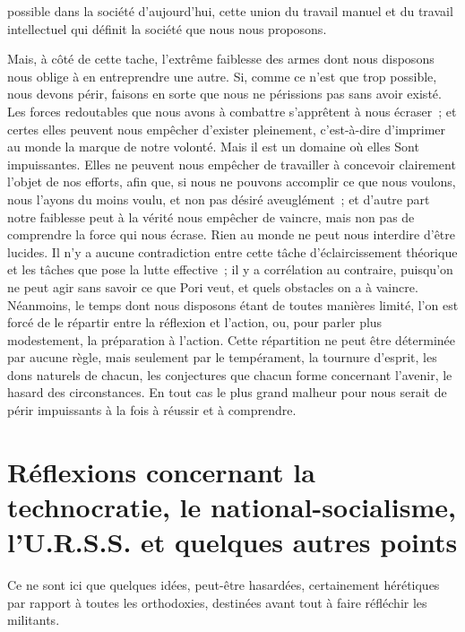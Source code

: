 \documentclass[french,twoside]{book} %
\newcommand{\signed}[1]{\bigbreak\filbreak{\raggedleft #1\par}\medskip}
\begin{document}
possible dans la société d'aujourd'hui, cette union du travail manuel et du travail intellectuel qui définit la société que nous nous proposons.\par
Mais, à côté de cette tache, l'extrême faiblesse des armes dont nous disposons nous oblige à en entreprendre une autre. Si, comme ce n'est que trop possible, nous devons périr, faisons en sorte que nous ne périssions pas sans avoir existé. Les forces redoutables que nous avons à combattre s'apprêtent à nous écraser ; et certes elles peuvent nous empêcher d'exister pleinement, c'est-à-dire d'imprimer au monde la marque de notre volonté. Mais il est un domaine où elles Sont impuissantes. Elles ne peuvent nous empêcher de travailler à concevoir clairement l'objet de nos efforts, afin que, si nous ne pouvons accomplir ce que nous voulons, nous l'ayons du moins voulu, et non pas désiré aveuglément ; et d'autre part notre faiblesse peut à la vérité nous empêcher de vaincre, mais non pas de comprendre la force qui nous écrase. Rien au monde ne peut nous interdire d'être lucides. Il n'y a aucune contradiction entre cette tâche d'éclaircissement théorique et les tâches que pose la lutte effective ; il y a corrélation au contraire, puisqu'on ne peut agir sans savoir ce que Pori veut, et quels obstacles on a à vaincre. Néanmoins, le temps dont nous disposons étant de toutes manières limité, l'on est forcé de le répartir entre la réflexion et l'action, ou, pour parler plus modestement, la préparation à l'action. Cette répartition ne peut être déterminée par aucune règle, mais seulement par le tempérament, la tournure d'esprit, les dons naturels de chacun, les conjectures que chacun forme concernant l'avenir, le hasard des circonstances. En tout cas le plus grand malheur pour nous serait de périr impuissants à la fois à réussir et à comprendre.\par


\signed{{\itshape (Révolution Prolétarienne}, no 158, 25 août 1933.)}
\section[{Réflexions concernant la technocratie, le national-socialisme, l’U.R.S.S. et quelques autres points}]{Réflexions concernant la technocratie, le national-socialisme, l’U.R.S.S. et quelques autres points}\renewcommand{\leftmark}{Réflexions concernant la technocratie, le national-socialisme, l’U.R.S.S. et quelques autres points}

\noindent \par
Ce ne sont ici que quelques idées, peut-être hasardées, certainement hérétiques par rapport à toutes les orthodoxies, destinées avant tout à faire réfléchir les militants.\par
\end{document}
